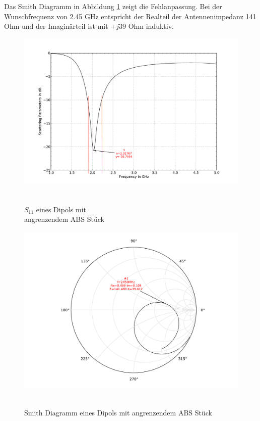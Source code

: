 Das Smith Diagramm in Abbildung \ref{fig:Smith_Dipol_ABS_4} zeigt die Fehlanpassung. Bei der Wunschfrequenz von 2.45 GHz entspricht der Realteil der Antennenimpedanz 141 Ohm und der Imaginärteil ist mit $+j39$ Ohm induktiv.
\begin{figure}[!h]
\begin{center}
  \includegraphics[width=\linewidth]{content/bilder/Evaluation/Dipol/S11DipolABS.pdf}
  \caption{\\$S_{11}$ eines Dipols mit \\angrenzendem ABS Stück}\label{fig:S11_Dipol_ABS_3}
\endminipage%
{}
  \includegraphics[width=\linewidth]{content/bilder/Evaluation/Dipol/SmithDipolABS.pdf}
  \caption{\\Smith Diagramm eines Dipols mit angrenzendem ABS Stück}\label{fig:Smith_Dipol_ABS_4}
\endminipage
\end{center}
\end{figure}

